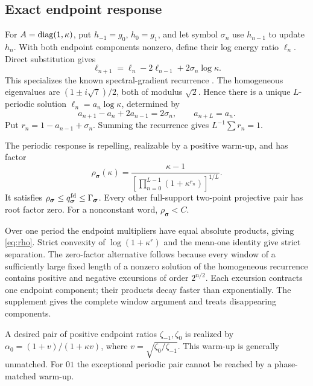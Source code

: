 \documentclass[letterpaper,twoside]{article}
\begin{document}
\subsection{Exact endpoint response}
For $A=\operatorname{diag}(1,\kappa)$, put $h_{-1}=g_0$, $h_0=g_1$, and let symbol $\sigma_n$ use $h_{n-1}$ to update $h_n$. With both endpoint components nonzero, define their log energy ratio $\ell_n$. Direct substitution gives
\begin{equation}\label{eq:forced}
 \ell_{n+1}=\ell_n-2\ell_{n-1}+2\sigma_n\log\kappa.
\end{equation}
This specializes the known spectral-gradient recurrence \cite{DaiHuangLiu2019}. The homogeneous eigenvalues are $(1\pm i\sqrt7)/2$, both of modulus $\sqrt2$. Hence there is a unique $L$-periodic solution $\ell_n=a_n\log\kappa$, determined by
\[
 a_{n+1}-a_n+2a_{n-1}=2\sigma_n,\qquad a_{n+L}=a_n.
\]
Put $r_n=1-a_{n-1}+\sigma_n$. Summing the recurrence gives $L^{-1}\sum r_n=1$.

\begin{proposition}\label{prop:two}
The periodic response is repelling, realizable by a positive warm-up, and has factor
\begin{equation}\label{eq:rho}
 \rho_{\bm\sigma}(\kappa)
 =\frac{\kappa-1}
 {\left[\prod_{n=0}^{L-1}(1+\kappa^{r_n})\right]^{1/L}}.
\end{equation}
It satisfies $\rho_{\bm\sigma}\le q^{\rm fd}_{\bm\sigma}\le\Gamma_{\bm\sigma}$. Every other full-support two-point projective pair has root factor zero. For a nonconstant word, $\rho_{\bm\sigma}<C$.
\end{proposition}

Over one period the endpoint multipliers have equal absolute products, giving \cref{eq:rho}. Strict convexity of $\log(1+\kappa^r)$ and the mean-one identity give strict separation. The zero-factor alternative follows because every window of a sufficiently large fixed length of a nonzero solution of the homogeneous recurrence contains positive and negative excursions of order $2^{n/2}$. Each excursion contracts one endpoint component; their products decay faster than exponentially. The supplement gives the complete window argument and treats disappearing components.

A desired pair of positive endpoint ratios $\zeta_{-1},\zeta_0$ is realized by $\alpha_0=(1+v)/(1+\kappa v)$, where $v=\sqrt{\zeta_0/\zeta_{-1}}$. This warm-up is generally unmatched. For $01$ the exceptional periodic pair cannot be reached by a phase-matched warm-up.
\end{document}
